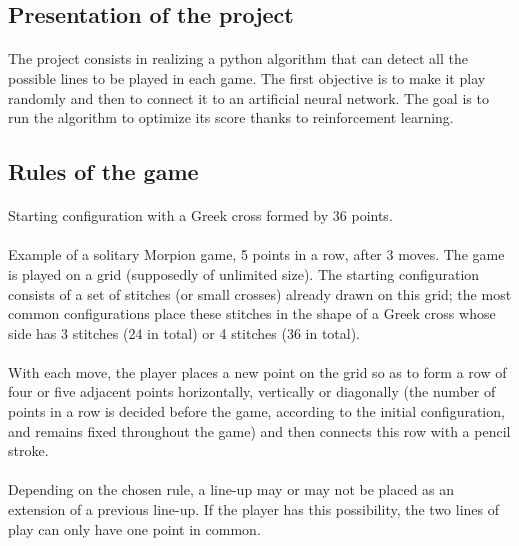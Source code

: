 \documentclass{article}
\begin{document}
\subsection{Presentation of the project}
\paragraph{}
\setlength{\parindent}{2cm}
The project consists in realizing a python algorithm that can detect all the possible lines to be played in each game. The first objective is to make it play randomly and then to connect it to an artificial neural network. The goal is to run the algorithm to optimize its score thanks to reinforcement learning.

\subsection{Rules of the game}
\paragraph{}
\setlength{\parindent}{2cm}
Starting configuration with a Greek cross formed by 36 points.\paragraph{}
\setlength{\parindent}{2cm}
Example of a solitary Morpion game, 5 points in a row, after 3 moves.
The game is played on a grid (supposedly of unlimited size). The starting configuration consists of a set of stitches (or small crosses) already drawn on this grid; the most common configurations place these stitches in the shape of a Greek cross whose side has 3 stitches (24 in total) or 4 stitches (36 in total).
\paragraph{}
\setlength{\parindent}{2cm}
With each move, the player places a new point on the grid so as to form a row of four or five adjacent points horizontally, vertically or diagonally (the number of points in a row is decided before the game, according to the initial configuration, and remains fixed throughout the game) and then connects this row with a pencil stroke.
\paragraph{}
\setlength{\parindent}{2cm}
Depending on the chosen rule, a line-up may or may not be placed as an extension of a previous line-up. If the player has this possibility, the two lines of play can only have one point in common.
\end{document}
